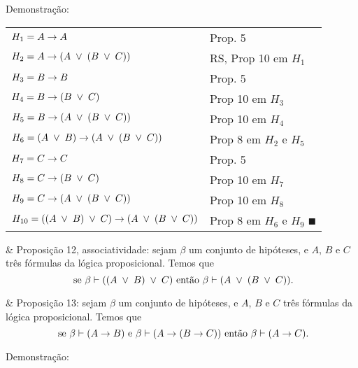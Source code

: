 Demonstração:

\begin{tabular}{p{}p{}}
  \hline
    $H_1 = A \rightarrow A$                                           & Prop. 5 \\
    $H_2 = A \rightarrow ( A \;\lor\; (B \;\lor\; C) )$                         & RS, Prop 10 em $H_1$ \\
    $H_3 = B \rightarrow B$                                           & Prop. 5 \\
    $H_4 = B \rightarrow (B \;\lor\; C)$                                   & Prop 10 em $H_3$ \\
    $H_5 = B \rightarrow ( A \;\lor\; (B \;\lor\; C) )$                         & Prop 10 em $H_4$ \\
    $H_6 = (A \;\lor\; B) \rightarrow ( A \;\lor\; (B \;\lor\; C) )$                 & Prop 8 em $H_2$ e $H_5$ \\
    $H_7 = C \rightarrow C$                                           & Prop. 5 \\
    $H_8 = C \rightarrow (B \;\lor\; C)$                                   & Prop 10 em $H_7$ \\
    $H_9 = C \rightarrow ( A \;\lor\; (B \;\lor\; C) )$                         & Prop 10 em $H_8$ \\
    $H_{10} = ( (A \;\lor\; B) \;\lor\; C ) \rightarrow ( A \;\lor\; (B \;\lor\; C) )$     & Prop 8 em $H_6$ e $H_9$ $\QED$ \\
  \hline
\end{tabular}

\SKIP

\begin{easylist}

  & Proposição 12, associatividade: sejam $\beta$ um conjunto de hipóteses, e $A$, $B$ e $C$ três fórmulas da lógica proposicional. Temos que \[ \mbox{ se } \beta \vdash ( (A \;\lor\; B) \;\lor\; C ) \mbox{ então } \beta \vdash (A \;\lor\; (B \;\lor\; C) ). \]

\SKIP
  
  & Proposição 13: sejam $\beta$ um conjunto de hipóteses, e $A$, $B$ e $C$ três fórmulas da lógica proposicional. Temos que \[ \mbox{ se } \beta \vdash (A \rightarrow B) \mbox{ e } \beta \vdash ( A \rightarrow (B \rightarrow C) ) \mbox{ então } \beta \vdash (A \rightarrow C). \]


\end{easylist}

Demonstração:

